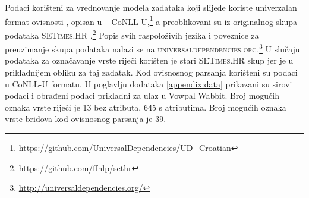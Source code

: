 Podaci korišteni za vrednovanje modela zadataka koji slijede koriste univerzalan
format ovisnosti , opisan u \citep{univdeps12} --
CoNLL-U,\footnote{\url{https://github.com/UniversalDependencies/UD_Croatian}} a
preoblikovani su iz originalnog skupa podataka \textsc{SETimes.HR}
\citep{agic2014setimes}.\footnote{\url{https://github.com/ffnlp/sethr}} Popis
svih raspoloživih jezika i poveznice za preuzimanje skupa podataka nalazi se
na \textsc{universaldependencies.org}.\footnote{\url{http://universaldependencies.org/}} U
slučaju podataka za označavanje vrste riječi korišten je stari
\textsc{SETimes.HR} skup jer je u prikladnijem obliku za taj zadatak. Kod
ovisnosnog parsanja korišteni su podaci u CoNLL-U formatu. U poglavlju
dodataka \ref{appendix:data} prikazani su sirovi podaci i obrađeni podaci
prikladni za ulaz u Vowpal Wabbit. Broj mogućih oznaka vrste riječi je 13 bez
atributa, 645 s atributima. Broj mogućih oznaka vrste bridova kod ovisnosnog
parsanja je 39.

